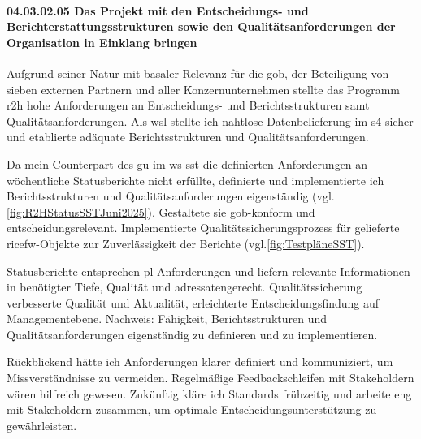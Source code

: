 \paragraph*{04.03.02.05 Das Projekt mit den Entscheidungs- und Berichterstattungsstrukturen sowie den Qualitätsanforderungen der Organisation in Einklang bringen}
\label{para:04.03.02.05_EntscheidungsUndBerichtsstrukturenUndQualitätsanforderungen}

\par Aufgrund seiner Natur mit basaler Relevanz für die \gls{gob}, der Beteiligung von sieben externen Partnern und aller Konzernunternehmen stellte das Programm \gls{r2h} hohe Anforderungen an Entscheidungs- und Berichtsstrukturen samt Qualitätsanforderungen. Als \gls{wsl} stellte ich nahtlose Datenbelieferung im \gls{s4} sicher und etablierte adäquate Berichtsstrukturen und Qualitätsanforderungen.

\par Da mein Counterpart des \gls{gu} im \gls{ws} \gls{sst} die definierten Anforderungen an wöchentliche Statusberichte nicht erfüllte, definierte und implementierte ich Berichtsstrukturen und Qualitätsanforderungen eigenständig (vgl. \autoref{fig:R2HStatusSSTJuni2025}). Gestaltete sie \gls{gob}-konform und entscheidungsrelevant. Implementierte Qualitätssicherungsprozess für gelieferte \gls{ricefw}-Objekte zur Zuverlässigkeit der Berichte (vgl.\autoref{fig:TestpläneSST}).

\par Statusberichte entsprechen \gls{pl}-Anforderungen und liefern relevante Informationen in benötigter Tiefe, Qualität und adressatengerecht. Qualitätssicherung verbesserte Qualität und Aktualität, erleichterte Entscheidungsfindung auf Managementebene. Nachweis: Fähigkeit, Berichtsstrukturen und Qualitätsanforderungen eigenständig zu definieren und zu implementieren.

\par Rückblickend hätte ich Anforderungen klarer definiert und kommuniziert, um Missverständnisse zu vermeiden. Regelmäßige Feedbackschleifen mit Stakeholdern wären hilfreich gewesen. Zukünftig kläre ich Standards frühzeitig und arbeite eng mit Stakeholdern zusammen, um optimale Entscheidungsunterstützung zu gewährleisten.
